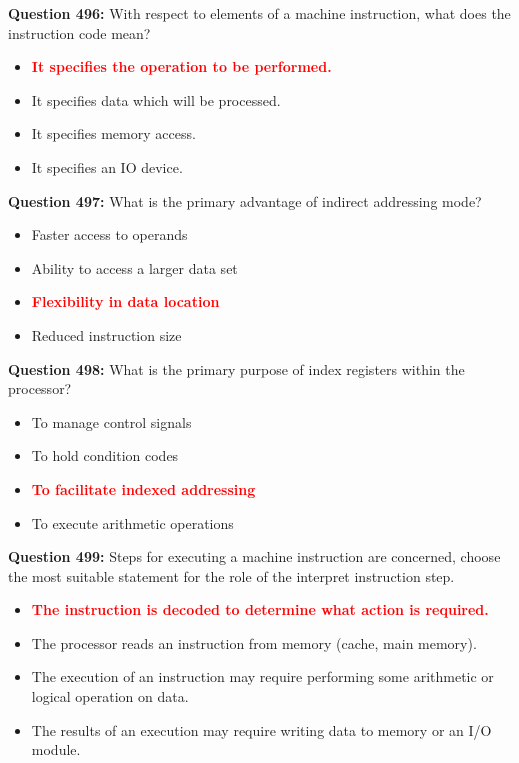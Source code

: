 \documentclass[12pt,a4paper]{article}
\begin{document}
\textbf{Question 496:} With respect to elements of a machine instruction, what does the instruction code mean?

\begin{itemize}
    \item[\textbf{A.}] \textcolor{red}{\textbf{It specifies the operation to be performed.}}
    \item[\textbf{B.}] It specifies data which will be processed.
    \item[\textbf{C.}] It specifies memory access.
    \item[\textbf{D.}] It specifies an IO device.
\end{itemize}

\vspace{0.5cm}

\textbf{Question 497:} What is the primary advantage of indirect addressing mode?

\begin{itemize}
    \item[\textbf{A.}] Faster access to operands
    \item[\textbf{B.}] Ability to access a larger data set
    \item[\textbf{C.}] \textcolor{red}{\textbf{Flexibility in data location}}
    \item[\textbf{D.}] Reduced instruction size
\end{itemize}

\vspace{0.5cm}

\textbf{Question 498:} What is the primary purpose of index registers within the processor?

\begin{itemize}
    \item[\textbf{A.}] To manage control signals
    \item[\textbf{B.}] To hold condition codes
    \item[\textbf{C.}] \textcolor{red}{\textbf{To facilitate indexed addressing}}
    \item[\textbf{D.}] To execute arithmetic operations
\end{itemize}

\vspace{0.5cm}

\textbf{Question 499:} Steps for executing a machine instruction are concerned, choose the most suitable statement for the role of the interpret instruction step.

\begin{itemize}
    \item[\textbf{A.}] \textcolor{red}{\textbf{The instruction is decoded to determine what action is required.}}
    \item[\textbf{B.}] The processor reads an instruction from memory (cache, main memory).
    \item[\textbf{C.}] The execution of an instruction may require performing some arithmetic or logical operation on data.
    \item[\textbf{D.}] The results of an execution may require writing data to memory or an I/O module.
\end{itemize}
\end{document}
